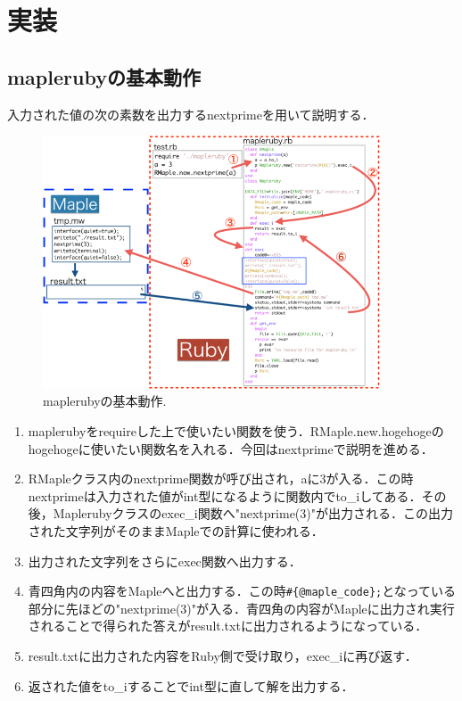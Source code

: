 \section{実装}
\subsection{maplerubyの基本動作}
入力された値の次の素数を出力するnextprimeを用いて説明する．

\begin{figure}[htbp]\begin{center}
\includegraphics[width=10cm,bb= 0 0 737 553]{../figs/./mapleruby_eringi.003.png}
\caption{maplerubyの基本動作.}
\label{default}\end{center}\end{figure}
\begin{enumerate}
\item maplerubyをrequireした上で使いたい関数を使う．RMaple.new.hogehogeのhogehogeに使いたい関数名を入れる．今回はnextprimeで説明を進める．
\item RMapleクラス内のnextprime関数が呼び出され，aに3が入る．この時nextprimeは入力された値がint型になるように関数内でto\_iしてある．その後，Maplerubyクラスのexec\_i関数へ"nextprime(3)"が出力される．この出力された文字列がそのままMapleでの計算に使われる．
\item 出力された文字列をさらにexec関数へ出力する．
\item 青四角内の内容をMapleへと出力する．この時\verb|#{@maple_code};|となっている部分に先ほどの"nextprime(3)"が入る．青四角の内容がMapleに出力され実行されることで得られた答えがresult.txtに出力されるようになっている．
\item result.txtに出力された内容をRuby側で受け取り，exec\_iに再び返す．
\item 返された値をto\_iすることでint型に直して解を出力する．
\end{enumerate}
